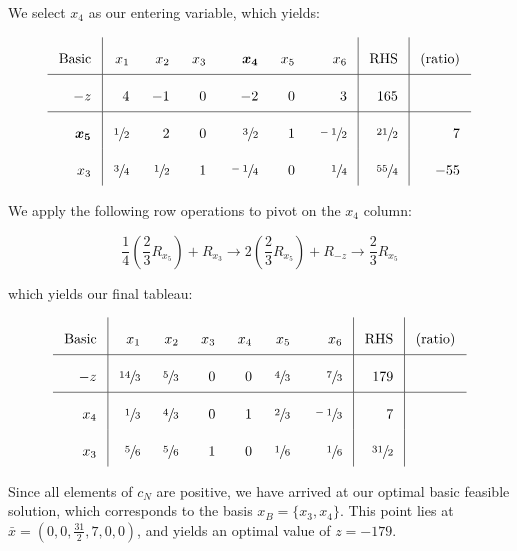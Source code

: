\begin{solution}
  We select $x_4$ as our entering variable, which yields:

  \[\arraycolsep=8pt\def\arraystretch{2.2}
  \begin{array}{r|rrrrrr|r|r}
    \text{Basic} &  x_1            &  x_2            &  x_3  &  \bm{x_4}       &  x_5  &   x_6           & \text{RHS}     & \text{(ratio)}  \\ \hline
    -z           &   4             &  -1             &  0    &  -2             &   0   &   3             &  165           &                 \\ \hline
    \bm{x_5}     &   \sfrac{1}{2}  &   2             &  0    &  \sfrac{3}{2}   &   1   &   \sfrac{-1}{2} &  \sfrac{21}{2} & 7               \\
    x_3          &   \sfrac{3}{4}  &   \sfrac{1}{2}  &  1    &  \sfrac{-1}{4}  &   0   &   \sfrac{1}{4}  &  \sfrac{55}{4} & -55                           
  \end{array}
  \]

  We apply the following row operations to pivot on the $x_4$ column:

  $$
  \frac{1}{4}\left(\frac{2}{3} R_{x_5} \right) + R_{x_3} \longrightarrow 
  2 \left(\frac{2}{3} R_{x_5} \right) + R_{-z} \longrightarrow
  \frac{2}{3} R_{x_5}
  $$

  \pagebreak

  which yields our final tableau:

  \[\arraycolsep=8pt\def\arraystretch{2.2}
  \begin{array}{r|rrrrrr|r|r}
    \text{Basic} &  x_1           &  x_2           &  x_3  &  x_4  &  x_5           &   x_6           & \text{RHS}     & \text{(ratio)}  \\ \hline
    -z           &  \sfrac{14}{3} &  \sfrac{5}{3}  &   0   &  0    &  \sfrac{4}{3}  &   \sfrac{7}{3}  &  179           &                 \\ \hline
    x_4          &  \sfrac{1}{3}  &  \sfrac{4}{3}  &   0   &  1    &  \sfrac{2}{3}  &   \sfrac{-1}{3} &  7             &                 \\
    x_3          &  \sfrac{5}{6}  &  \sfrac{5}{6}  &   1   &  0    &  \sfrac{1}{6}  &   \sfrac{1}{6}  &  \sfrac{31}{2} &                            
  \end{array}
  \]

  Since all elements of $c_N$ are positive, we have arrived at our optimal basic feasible solution, which corresponds to
  the basis $x_B = \{x_3, x_4\}$. This point lies at \linebreak
  $\bar{x} = \left(0, 0, \frac{31}{2}, 7, 0, 0\right)$, and yields an optimal value of $z = -179$.
  \ \\
\end{solution}